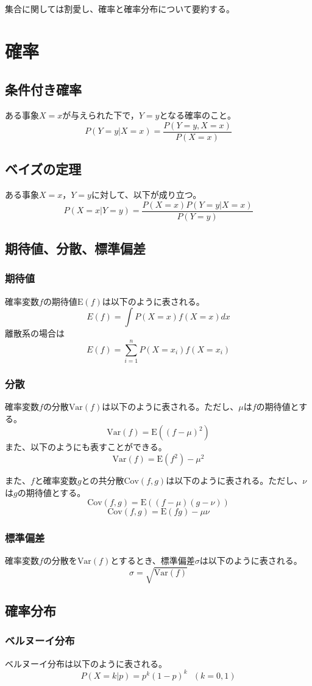 \documentclass[b5paper,12pt]{jarticle}
\begin{document}
集合に関しては割愛し、確率と確率分布について要約する。
\section{確率}

\subsection{条件付き確率}
ある事象$X=x$が与えられた下で，$Y=y$となる確率のこと。
\[
    P(Y=y|X=x)=\frac{P(Y=y,X=x)}{P(X=x)}
\]
\subsection{ベイズの定理}
ある事象$X=x$，$Y=y$に対して、以下が成り立つ。
\[
    P(X=x|Y=y)=\frac{P(X=x)P(Y=y|X=x)}{P(Y=y)}
\]
\subsection{期待値、分散、標準偏差}
\subsubsection{期待値}
確率変数$f$の期待値$\text{E}(f)$は以下のように表される。
\[
    E(f)=\int P(X=x)f(X=x)dx
\]
離散系の場合は
\[
    E(f)=\sum_{i=1}^n P(X=x_i)f(X=x_i)
\]
\subsubsection{分散}
確率変数$f$の分散$\text{Var}(f)$は以下のように表される。ただし、$\mu$は$f$の期待値とする。
\[
    \text{Var}(f)=\text{E}((f-\mu)^2)
\]
また、以下のようにも表すことができる。
\[
    \text{Var}(f)=\text{E}(f^2)-\mu^2
\]

また、$f$と確率変数$g$との共分散$\text{Cov}(f,g)$は以下のように表される。ただし、$\nu$は$g$の期待値とする。
\[
    \text{Cov}(f,g)=\text{E}((f-\mu)(g-\nu))
\]
\[
    \text{Cov}(f,g)=\text{E}(fg)-\mu\nu
\]

\subsubsection{標準偏差}
確率変数$f$の分散を$\text{Var}(f)$とするとき、標準偏差$\sigma$は以下のように表される。
\[
    \sigma=\sqrt{\text{Var}(f)}
\]

\subsection{確率分布}
\subsubsection{ベルヌーイ分布}
ベルヌーイ分布は以下のように表される。
\[
    P(X=k|p)=p^k(1-p)^k ~~~(k=0,1)
\]
\end{document}
